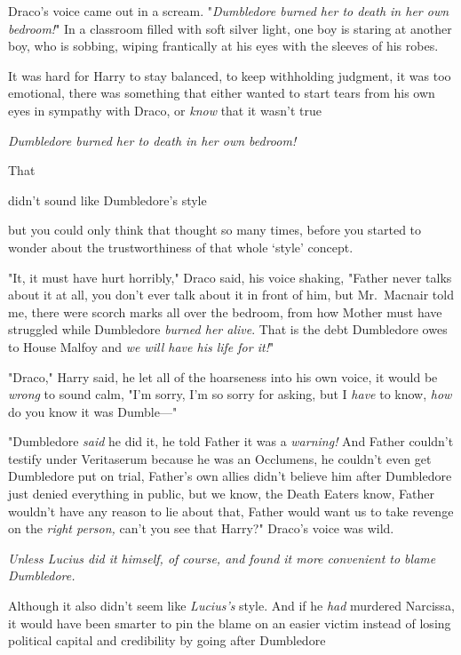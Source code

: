 Draco's voice came out in a scream. "\emph{Dumbledore burned her to death in
her own bedroom!}"
\sbreak
In a classroom filled with soft silver light, one boy is staring at another
boy, who is sobbing, wiping frantically at his eyes with the sleeves of his
robes.

It was hard for Harry to stay balanced, to keep withholding judgment, it was
too emotional, there was something that either wanted to start tears from his
own eyes in sympathy with Draco, or \emph{know} that it wasn't true{\el}

\emph{Dumbledore burned her to death in her own bedroom!}

That{\el}

{\el} didn't sound like Dumbledore's style{\el}

{\el} but you could only think that thought so many times, before you started
to wonder about the trustworthiness of that whole `style' concept.

"It, it must have hurt horribly," Draco said, his voice shaking, "Father never
talks about it at all, you don't ever talk about it in front of him, but
Mr.~Macnair told me, there were scorch marks all over the bedroom, from how
Mother must have struggled while Dumbledore \emph{burned her alive}. That is
the debt Dumbledore owes to House Malfoy and \emph{we will have his life for
it!}"

"Draco," Harry said, he let all of the hoarseness into his own voice, it would
be \emph{wrong} to sound calm, "I'm sorry, I'm so sorry for asking, but I
\emph{have} to know, \emph{how} do you know it was Dumble\mbox{---}"

"Dumbledore \emph{said} he did it, he told Father it was a \emph{warning!} And
Father couldn't testify under Veritaserum because he was an Occlumens, he
couldn't even get Dumbledore put on trial, Father's own allies didn't believe
him after Dumbledore just denied everything in public, but we know, the Death
Eaters know, Father wouldn't have any reason to lie about that, Father would
want us to take revenge on the \emph{right person,} can't you see that Harry?"
Draco's voice was wild.

\emph{Unless Lucius did it himself, of course, and found it more convenient to
blame Dumbledore.}

Although{\el} it also didn't seem like \emph{Lucius's} style. And if he
\emph{had} murdered Narcissa, it would have been smarter to pin the blame on an
easier victim instead of losing political capital and credibility by going
after Dumbledore{\el}

